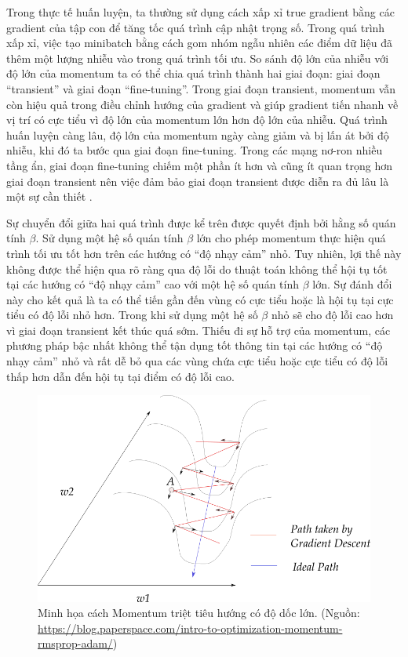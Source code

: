 Trong thực tế huấn luyện, ta thường sử dụng cách xấp xỉ true gradient bằng các gradient của tập con để tăng tốc quá trình cập nhật trọng số. Trong quá trình xấp xỉ, việc tạo minibatch bằng cách gom nhóm ngẫu nhiên các điểm dữ liệu đã thêm một lượng nhiễu vào trong quá trình tối ưu. So sánh độ lớn của nhiễu với độ lớn của momentum ta có thể chia quá trình thành hai giai đoạn: giai đoạn ``transient'' và giai đoạn ``fine-tuning''. Trong giai đoạn transient, momentum vẫn còn hiệu quả trong điều chỉnh hướng của gradient và giúp gradient tiến nhanh về vị trí có cực tiểu vì độ lớn của momentum lớn hơn độ lớn của nhiễu. Quá trình huấn luyện càng lâu, độ lớn của momentum ngày càng giảm và bị lấn át bởi độ nhiễu, khi đó ta bước qua giai đoạn fine-tuning. Trong các mạng nơ-ron nhiều tầng ẩn, giai đoạn fine-tuning chiếm một phần ít hơn và cũng ít quan trọng hơn giai đoạn transient nên việc đảm bảo giai đoạn transient được diễn ra đủ lâu là một sự cần thiết \cite{sutskever2013onti}.

Sự chuyển đổi giữa hai quá trình được kể trên được quyết định bởi hằng số quán tính $\beta$. Sử dụng một hệ số quán tính $\beta$ lớn cho phép momentum thực hiện quá trình tối ưu tốt hơn trên các hướng có ``độ nhạy cảm'' nhỏ. Tuy nhiên, lợi thế này không được thể hiện qua rõ ràng qua độ lỗi do thuật toán không thể hội tụ tốt tại các hướng có ``độ nhạy cảm'' cao với một hệ số quán tính $\beta$ lớn. Sự đánh đổi này cho kết quả là ta có thể tiến gần đến vùng có cực tiểu hoặc là hội tụ tại cực tiểu có độ lỗi nhỏ hơn. Trong khi sử dụng một hệ số $\beta$ nhỏ sẽ cho độ lỗi cao hơn vì giai đoạn transient kết thúc quá sớm. Thiếu đi sự hỗ trợ của momentum, các phương pháp bậc nhất không thể tận dụng tốt thông tin tại các hướng có ``độ nhạy cảm'' nhỏ và rất dễ bỏ qua các vùng chứa cực tiểu hoặc cực tiểu có độ lỗi thấp hơn dẫn đến hội tụ tại điểm có độ lỗi cao.

\begin{figure}[htp]
	\centering
	\includegraphics[width=140 mm]{images/valley-momentum.png}
	\caption{Minh họa cách Momentum triệt tiêu hướng có độ dốc lớn. (Nguồn: \url{https://blog.paperspace.com/intro-to-optimization-momentum-rmsprop-adam/})}
	\label{fig:valley-momentum}
\end{figure}

